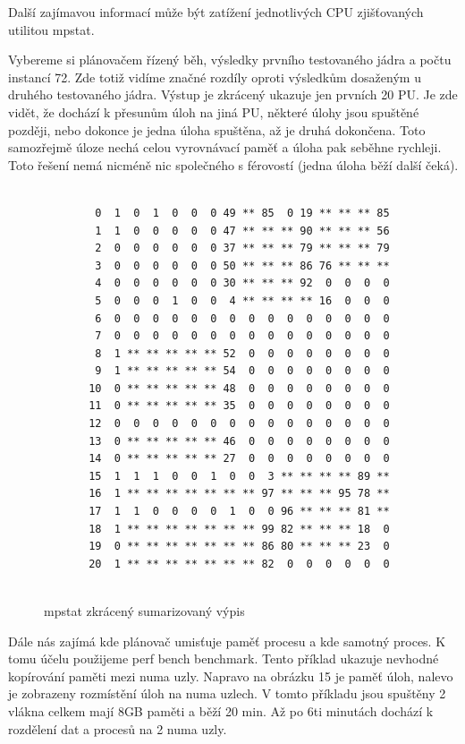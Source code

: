\documentclass[a4paper,12pt]{article}
\begin{document}
Další zajímavou informací může být zatížení jednotlivých CPU zjišťovaných utilitou mpstat.

Vybereme si plánovačem řízený běh, výsledky prvního testovaného jádra a počtu instancí 72. Zde totiž vidíme značné rozdíly oproti výsledkům dosaženým u druhého testovaného jádra. Výstup je zkrácený ukazuje jen prvních 20 PU. Je zde vidět, že dochází k přesunům úloh na jiná PU, některé úlohy jsou spuštěné později, nebo dokonce je jedna úloha spuštěna, až je druhá dokončena. Toto samozřejmě úloze nechá celou vyrovnávací paměť a úloha pak seběhne rychleji. Toto řešení nemá nicméně nic společného s férovostí (jedna úloha běží další čeká).

\begin{figure}[ht]
\caption{mpstat zkrácený sumarizovaný výpis}
\center
\label{mpstat2}

\begin{Verbatim}[frame=single]

        0  1  0  1  0  0  0 49 ** 85  0 19 ** ** ** 85 
        1  1  0  0  0  0  0 47 ** ** ** 90 ** ** ** 56 
        2  0  0  0  0  0  0 37 ** ** ** 79 ** ** ** 79 
        3  0  0  0  0  0  0 50 ** ** ** 86 76 ** ** ** 
        4  0  0  0  0  0  0 30 ** ** ** 92  0  0  0  0 
        5  0  0  0  1  0  0  4 ** ** ** ** 16  0  0  0 
        6  0  0  0  0  0  0  0  0  0  0  0  0  0  0  0 
        7  0  0  0  0  0  0  0  0  0  0  0  0  0  0  0 
        8  1 ** ** ** ** ** 52  0  0  0  0  0  0  0  0 
        9  1 ** ** ** ** ** 54  0  0  0  0  0  0  0  0 
       10  0 ** ** ** ** ** 48  0  0  0  0  0  0  0  0 
       11  0 ** ** ** ** ** 35  0  0  0  0  0  0  0  0 
       12  0  0  0  0  0  0  0  0  0  0  0  0  0  0  0 
       13  0 ** ** ** ** ** 46  0  0  0  0  0  0  0  0 
       14  0 ** ** ** ** ** 27  0  0  0  0  0  0  0  0 
       15  1  1  1  0  0  1  0  0  3 ** ** ** ** 89 ** 
       16  1 ** ** ** ** ** ** ** 97 ** ** ** 95 78 ** 
       17  1  1  0  0  0  0  1  0  0 96 ** ** ** 81 ** 
       18  1 ** ** ** ** ** ** ** 99 82 ** ** ** 18  0 
       19  0 ** ** ** ** ** ** ** 86 80 ** ** ** 23  0 
       20  1 ** ** ** ** ** ** ** 82  0  0  0  0  0  0 
      
\end{Verbatim}
\end{figure}
\newpage

Dále nás zajímá kde plánovač umisťuje paměť procesu a kde samotný proces. K tomu účelu použijeme perf bench benchmark. Tento příklad ukazuje nevhodné kopírování paměti mezi numa uzly. Napravo na obrázku 15 je paměť úloh, nalevo je zobrazeny rozmístění úloh na numa uzlech. V tomto příkladu jsou spuštěny 2 vlákna celkem mají 8GB paměti a běží 20 min. Až po 6ti minutách dochází k rozdělení dat a procesů na 2 numa uzly. 
\end{document}
